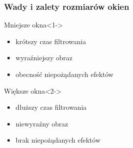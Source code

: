 \documentclass{beamer}
\begin{document}
\begin{frame}
\begin{figure}
{}
\end{figure}
\end{frame}
\begin{frame}
\frametitle{Wady i zalety rozmiarów okien}
\begin{block}{Mniejsze okna}<1->
\begin{itemize}
\item krótszy czas filtrowania
\item wyraźniejszy obraz
\item obecność niepożądanych efektów
\end{itemize}
\end{block}
\begin{block}{Większe okna}<2->
\begin{itemize}
\item dłuższy czas filtrowania
\item niewyraźny obraz
\item brak niepożądanych efektów
\end{itemize}
\end{block}
\end{frame}
\end{document}
